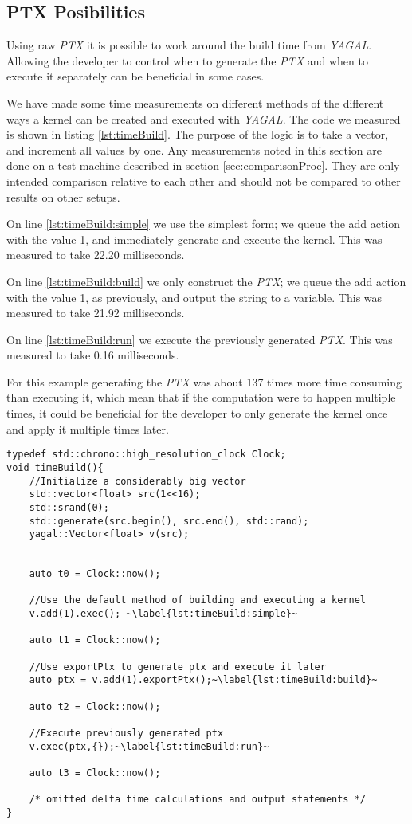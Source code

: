 \subsection{PTX Posibilities}
Using raw \textit{PTX} it is possible to work around the build time from \textit{YAGAL}. Allowing the developer to control when to generate the \textit{PTX} and when to execute it separately can be beneficial in some cases.

We have made some time measurements on different methods of the different ways a kernel can be created and executed with \textit{YAGAL}. The code we measured is shown in listing \ref{lst:timeBuild}. The purpose of the logic is to take a vector, and increment all values by one. Any measurements noted in this section are done on a test machine described in section \ref{sec:comparisonProc}. They are only intended comparison relative to each other and should not be compared to other results on other setups.

On line \ref{lst:timeBuild:simple} we use the simplest form; we queue the add action with the value 1, and immediately generate and execute the kernel. This was measured to take 22.20 milliseconds.

On line \ref{lst:timeBuild:build} we only construct the \textit{PTX}; we queue the add action with the value 1, as previously, and output the string to a variable. This was measured to take 21.92 milliseconds.

On line \ref{lst:timeBuild:run} we execute the previously generated \textit{PTX}. This was measured to take 0.16 milliseconds.

For this example generating the \textit{PTX} was about 137 times more time consuming than executing it, which mean that if the computation were to happen multiple times, it could be beneficial for the developer to only generate the kernel once and apply it multiple times later.

\begin{lstlisting}[caption={Building and executing \textit{PTX} in action}, label={lst:timeBuild}]
typedef std::chrono::high_resolution_clock Clock;
void timeBuild(){
    //Initialize a considerably big vector
    std::vector<float> src(1<<16);
    std::srand(0);
    std::generate(src.begin(), src.end(), std::rand);
    yagal::Vector<float> v(src);


    auto t0 = Clock::now();

    //Use the default method of building and executing a kernel
    v.add(1).exec(); ~\label{lst:timeBuild:simple}~

    auto t1 = Clock::now();

    //Use exportPtx to generate ptx and execute it later
    auto ptx = v.add(1).exportPtx();~\label{lst:timeBuild:build}~

    auto t2 = Clock::now();

    //Execute previously generated ptx
    v.exec(ptx,{});~\label{lst:timeBuild:run}~

    auto t3 = Clock::now();

    /* omitted delta time calculations and output statements */
}
\end{lstlisting}
